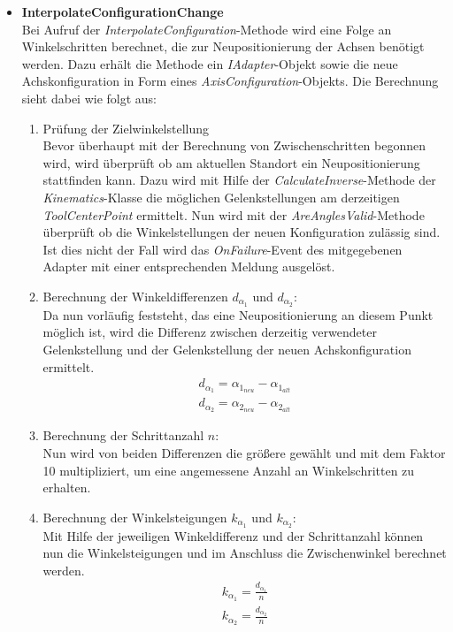 \begin{itemize}
\item \textbf{InterpolateConfigurationChange}\\
Bei Aufruf der \textit{InterpolateConfiguration}-Methode wird eine Folge an Winkelschritten berechnet, die zur Neupositionierung der Achsen benötigt werden. Dazu erhält die Methode ein \textit{IAdapter}-Objekt sowie die neue Achskonfiguration in Form eines \textit{AxisConfiguration}-Objekts. 
Die Berechnung sieht dabei wie folgt aus:
\begin{enumerate}
\item Prüfung der Zielwinkelstellung\\
Bevor überhaupt mit der Berechnung von Zwischenschritten begonnen wird, wird überprüft ob am aktuellen Standort ein Neupositionierung stattfinden kann. 
Dazu wird mit Hilfe der \textit{CalculateInverse}-Methode der \textit{Kinematics}-Klasse die möglichen Gelenkstellungen am derzeitigen \textit{ToolCenterPoint} ermittelt. Nun wird mit der \textit{AreAnglesValid}-Methode überprüft ob die Winkelstellungen der neuen Konfiguration zulässig sind.
Ist dies nicht der Fall wird das \textit{OnFailure}-Event des mitgegebenen Adapter mit einer entsprechenden Meldung ausgelöst.
\newpage
\item Berechnung der Winkeldifferenzen $d_{\alpha_1}$ und $d_{\alpha_2}$:\\
Da nun vorläufig feststeht, das eine Neupositionierung an diesem Punkt möglich ist, wird die Differenz zwischen derzeitig verwendeter Gelenkstellung und der Gelenkstellung der neuen Achskonfiguration ermittelt.
\begin{align*}
d_{\alpha_1} = \alpha_{1_{neu}} - \alpha_{1_{alt}}\\
d_{\alpha_2} = \alpha_{2_{neu}} - \alpha_{2_{alt}}
\end{align*}
\item Berechnung der Schrittanzahl $n$:\\
Nun wird von beiden Differenzen die größere gewählt und mit dem Faktor 10 multipliziert, um eine angemessene Anzahl an Winkelschritten zu erhalten.
\item Berechnung der Winkelsteigungen $k_{\alpha_1}$ und $k_{\alpha_2}$:\\
Mit Hilfe der jeweiligen Winkeldifferenz und der Schrittanzahl können nun die Winkelsteigungen und im Anschluss die Zwischenwinkel berechnet werden.
\begin{align*}
k_{\alpha_1} = \frac{d_{\alpha_1}}{n}\\
k_{\alpha_2} = \frac{d_{\alpha_2}}{n}
\end{align*}

\end{enumerate}
\end{itemize}
